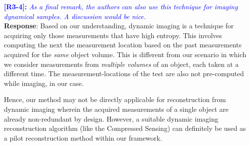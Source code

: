 \documentclass[11pt]{article}
\begin{document}
\vspace{0.5cm}\textcolor{blue}{\textbf{[R3-4]:} \textit{As a final remark, the authors can also use this technique for imaging dynamical samples. A discussion would be nice.}}\\

\textbf{Response}: Based on our understanding, dynamic imaging is a technique for acquiring only those measurements that have high entropy. This involves computing the next the measurement location based on the past measurements acquired for the \textit{same} object volume. This is different from our scenario in which we consider measurements from \textit{multiple volumes} of an object, each taken at a different time. The measurement-locations of the test are also not pre-computed while imaging, in our case. 

Hence, our method may not be directly applicable for reconstruction from dynamic imaging wherein the acquired measurements of a single object are already non-redundant by design. However, a suitable dynamic imaging reconstruction algorithm (like the Compressed Sensing)  can definitely be used as a pilot reconstruction method within our framework. 



    
  
\end{document}
